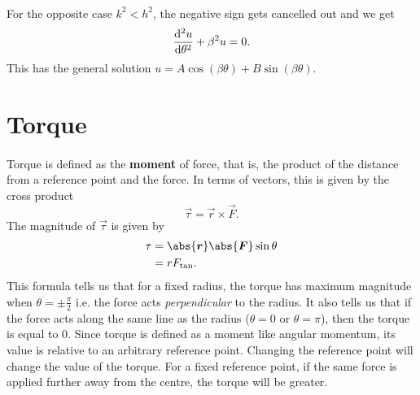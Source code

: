 \documentclass[../classical_mechanics.tex]{subfiles}
\begin{document}
\begin{example}
            \paragraph{}
            For the opposite case $k^2<h^2$, the negative sign gets cancelled out and we get
            \begin{equation}
                \dv[2]{u}{\theta}+\beta^2 u=0.
            \end{equation}
            This has the general solution $u=A\cos(\beta\theta)+B\sin(\beta\theta)$.

        \end{example}

    \section{Torque}
        \paragraph{}
        Torque is defined as the \textbf{moment} of force, that is, the product of the distance from a reference point and the force.
        In terms of vectors, this is given by the cross product
        \begin{equation}
            \vec{\tau}=\vec{r}\times\vec{F}.
        \end{equation}
        The magnitude of $\vec{\tau}$ is given by
        \begin{align}
            \tau&=\abs{\vec{r}}\abs{\vec{F}}\sin\theta\\
            &=rF_\text{tan}.
        \end{align}
        This formula tells us that for a fixed radius, the torque has maximum magnitude when $\theta=\pm\frac{\pi}{2}$ i.e. the force acts \textit{perpendicular} to the radius.
        It also tells us that if the force acts along the same line as the radius ($\theta=0$ or $\theta=\pi$), then the torque is equal to 0.
        Since torque is defined as a moment like angular momentum, its value is relative to an arbitrary reference point.
        Changing the reference point will change the value of the torque.
        For a fixed reference point, if the same force is applied further away from the centre, the torque will be greater.
        
\end{document}
